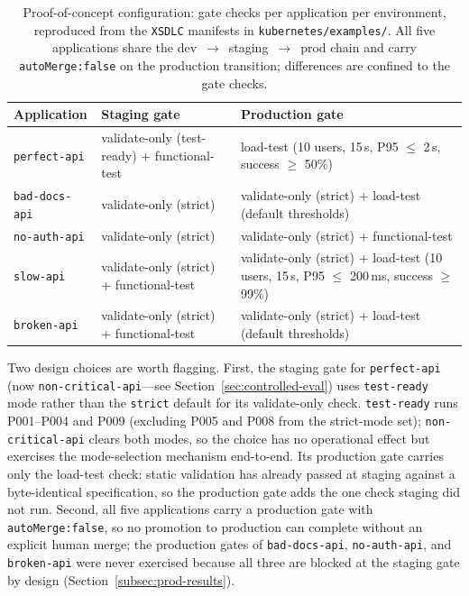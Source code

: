 \begin{table}[htbp]
\centering
\caption{Proof-of-concept configuration: gate checks per application per environment, reproduced from the \texttt{XSDLC} manifests in \texttt{kubernetes/examples/}. All five applications share the dev~$\rightarrow$~staging~$\rightarrow$~prod chain and carry \texttt{autoMerge:false} on the production transition; differences are confined to the gate checks.}
\label{tab:operational-poc-config}
\footnotesize
\begin{tabular}{@{}l p{} p{}@{}}
\toprule
\textbf{Application} & \textbf{Staging gate} & \textbf{Production gate} \\
\midrule
\texttt{perfect-api} & validate-only (test-ready) + functional-test & load-test (10 users, 15\,s, P95 $\leq$ 2\,s, success $\geq$ 50\%) \\
\texttt{bad-docs-api} & validate-only (strict) & validate-only (strict) + load-test (default thresholds) \\
\texttt{no-auth-api}  & validate-only (strict) & validate-only (strict) + functional-test \\
\texttt{slow-api}     & validate-only (strict) + functional-test & validate-only (strict) + load-test (10 users, 15\,s, P95 $\leq$ 200\,ms, success $\geq$ 99\%) \\
\texttt{broken-api}   & validate-only (strict) + functional-test & validate-only (strict) + load-test (default thresholds) \\
\bottomrule
\end{tabular}
\end{table}

Two design choices are worth flagging. First, the staging gate for \texttt{perfect-api} (now \texttt{non-critical-api}---see Section~\ref{sec:controlled-eval}) uses \texttt{test-ready} mode rather than the \texttt{strict} default for its validate-only check. \texttt{test-ready} runs P001--P004 and P009 (excluding P005 and P008 from the strict-mode set); \texttt{non-critical-api} clears both modes, so the choice has no operational effect but exercises the mode-selection mechanism end-to-end. Its production gate carries only the load-test check: static validation has already passed at staging against a byte-identical specification, so the production gate adds the one check staging did not run. Second, all five applications carry a production gate with \texttt{autoMerge:false}, so no promotion to production can complete without an explicit human merge; the production gates of \texttt{bad-docs-api}, \texttt{no-auth-api}, and \texttt{broken-api} were never exercised because all three are blocked at the staging gate by design (Section~\ref{subsec:prod-results}).

